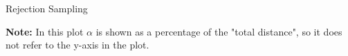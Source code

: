 \documentclass[11pt,compress,t,notes=noshow, xcolor=table]{beamer}
\begin{document}
\begin{vbframe}{Rejection Sampling}
\vspace*{-0.3cm}
\begin{footnotesize}
\textbf{Note:} In this plot $\alpha$ is shown as a percentage of the "total distance", so it does not refer to the y-axis in the plot.
\end{footnotesize}

\framebreak

\begin{algorithm}[H]
  \caption{Rejection Sampling}
  \begin{algorithmic}[1]
    \Else
    \EndIf
  \EndWhile
  \end{algorithmic}
\end{algorithm}

\end{vbframe}
\end{document}
